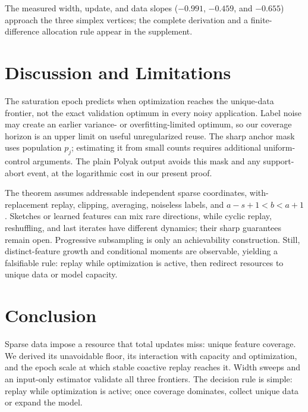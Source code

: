 \documentclass[letterpaper]{article}
\begin{document}
The measured width, update, and data slopes ($-0.991$, $-0.459$, and
$-0.655$) approach the three simplex vertices; the complete derivation and a
finite-difference allocation rule appear in the supplement.

\section{Discussion and Limitations}

The saturation epoch predicts when optimization reaches the unique-data
frontier, not the exact validation optimum in every noisy application.  Label
noise may create an earlier variance- or overfitting-limited optimum, so our
coverage horizon is an upper limit on useful unregularized reuse.  The sharp
anchor mask uses population $p_j$; estimating it from small counts requires
additional uniform-control arguments.  The plain Polyak output avoids this
mask and any support-abort event, at the logarithmic cost in our present proof.

The theorem assumes addressable independent sparse coordinates,
with-replacement replay, clipping, averaging, noiseless labels, and
$a-s+1<b<a+1$.  Sketches or learned features can mix rare directions, while
cyclic replay, reshuffling, and last iterates have different dynamics; their
sharp guarantees remain open.  Progressive subsampling is only an achievability
construction.  Still, distinct-feature growth and conditional moments are
observable, yielding a falsifiable rule: replay while optimization is active,
then redirect resources to unique data or model capacity.

\section{Conclusion}

Sparse data impose a resource that total updates miss: unique feature coverage.
We derived its unavoidable floor, its interaction with capacity and optimization,
and the epoch scale at which stable coactive replay reaches it. Width sweeps and
an input-only estimator validate all three frontiers. The decision rule is
simple: replay while optimization is active; once coverage dominates, collect
unique data or expand the model.


\end{document}
